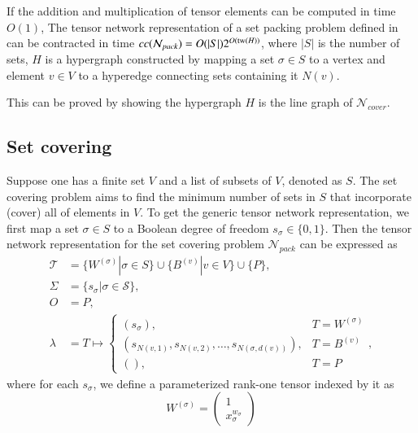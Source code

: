 \documentclass[review, onefignum, onetabnum]{siamart190516}
\begin{document}
\begin{theorem}\label{thm:packcomplex}
    If the addition and multiplication of tensor elements can be computed in time $O(1)$,
    The tensor network representation of a set packing problem defined in  can be contracted in time $cc(\mathcal{N}_{pack}) = O(|S|)2^{O({\rm tw}(H))}$, where $|S|$ is the number of sets,
    $H$ is a hypergraph constructed by mapping a set $\sigma\in S$ to a vertex and element $v \in V$ to a hyperedge connecting sets containing it $N(v)$.
\end{theorem}
This can be proved by showing the hypergraph $H$ is the line graph of $\mathcal{N}_{cover}$.

\subsection{Set covering}
Suppose one has a finite set $V$ and a list of subsets of $V$, denoted as $S$.
The set covering problem aims to find the minimum number of sets in $S$ that incorporate (cover) all of elements in $V$.
To get the generic tensor network representation, we first map a set $\sigma \in S$ to a Boolean degree of freedom $s_\sigma\in\{0, 1\}$.
Then the tensor network representation for the set covering problem $\mathcal{N}_{pack}$ can be expressed as
\begin{equation}\label{eq:covertensornetwork}
\begin{split}
    \mathcal{T} &= \{W^{(\sigma)} | \sigma \in S\} \cup \{B^{(v)} | v \in V\} \cup \{P\},\\
    \Sigma &= \{s_\sigma | \sigma \in \mathcal{S}\},\\
    O &= P,\\
    \lambda &= T \mapsto \begin{cases}
                    (s_\sigma), & T = W^{(\sigma)}\\
                    (s_{N(v, 1)},s_{N(v, 2)},\ldots,s_{N(\sigma, d(v))}), & T = B^{(v)}\\
                    (), & T = P
                    \end{cases},
\end{split}
\end{equation}
where for each $s_\sigma$, we define a parameterized rank-one tensor indexed by it as
\begin{equation}
W^{(\sigma)} = \left(\begin{matrix}
    1 \\
    x_\sigma^{w_\sigma}
    \end{matrix}\right)
\end{equation}
\end{document}
